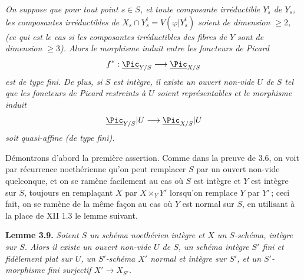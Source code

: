 \emph{On suppose que pour tout point \(s\in S\), et toute composante irr\'eductible \(Y_s^i\) de \(Y_s\), les composantes irr\'eductibles de \(X_s\cap Y_s^i=V(\varphi|Y_s^i)\) soient de dimension \(\ge2\), (ce qui est le cas si les composantes irr\'eductibles des fibres de \(Y\) sont de dimension \(\ge3\)). Alors le morphisme induit entre les foncteurs de Picard}
\[
f^*:\underline{\Pic}_{Y/S}\longrightarrow\underline{\Pic}_{X/S}
\]
\emph{est de type fini. De plus, si \(S\) est int\`egre, il existe un ouvert non-vide \(U\) de \(S\) tel que les foncteurs de Picard restreints \`a \(U\) soient repr\'esentables et le morphisme induit}
\[
\underline{\Pic}_{Y/S}|U\longrightarrow\underline{\Pic}_{X/S}|U
\]
\emph{soit quasi-affine (de type fini).}

D\'emontrons d'abord la premi\`ere assertion. Comme dans la preuve de 3.6, on voit par r\'ecurrence noeth\'erienne qu'on peut remplacer \(S\) par un ouvert non-vide quelconque, et on se ram\`ene facilement au cas o\`u \(S\) est int\`egre et \(Y\) est int\`egre sur \(S\), toujours en rempla\c{c}ant \(X\) par \(X\times_YY'\) lorsqu'on remplace \(Y\) par \(Y'\)\,; ceci fait, on se ram\`ene de la m\^eme fa\c{c}on au cas o\`u \(Y\) est normal sur \(S\), en utilisant \`a la place de XII 1.3 le lemme suivant.

\textbf{Lemme 3.9.} \emph{Soient \(S\) un sch\'ema noeth\'erien int\`egre et \(X\) un \(S\)-sch\'ema, int\`egre sur \(S\). Alors il existe un ouvert non-vide \(U\) de \(S\), un sch\'ema int\`egre \(S'\) fini et fid\`element plat sur \(U\), un \(S'\)-sch\'ema \(X'\) normal et int\`egre sur \(S'\), et un \(S'\)-morphisme fini surjectif \(X'\to X_{S'}\).}

